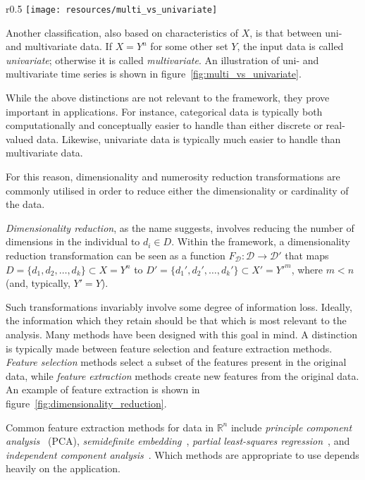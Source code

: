 \begin{wrapfigure}{r}{0.5\textwidth}
\changecaptionwidth
{}
\texttt{[image: resources/multi\_vs\_univariate]}
\caption[derp]{Two sine curves regarded as two separate univariate time series (dotted lines) and as one multivariate time series (solid lines).}
\label{fig:multi_vs_univariate}
\end{wrapfigure}

Another classification, also based on characteristics of $X$, is that between uni- and multivariate data. If $X = Y^n$ for some other set $Y$, the input data is called \emph{univariate}; otherwise it is called \emph{multivariate}. An illustration of uni- and multivariate time series is shown in figure~\ref{fig:multi_vs_univariate}.

While the above distinctions are not relevant to the framework, they prove important in applications. For instance, categorical data is typically both computationally and conceptually easier to handle than either discrete or real-valued data. Likewise, univariate data is typically much easier to handle than multivariate data.

For this reason, dimensionality and numerosity reduction transformations are commonly utilised in order to reduce either the dimensionality or cardinality of the data.

\emph{Dimensionality reduction}, as the name suggests, involves reducing the number of dimensions in the individual to $d_i \in D$. Within the framework, a dimensionality reduction transformation can be seen as a function $F_\mathcal{D}: \mathcal{D} \rightarrow \mathcal{D}'$ that maps $D = \{d_1, d_2, \dots, d_k\} \subset X = Y^n$ to $D' = \{d_1', d_2', \dots, d_k'\} \subset X' = {Y'}^m$, where $m < n$ (and, typically, $Y' = Y$).

Such transformations invariably involve some degree of information loss. Ideally, the information which they retain should be that which is most relevant to the analysis. Many methods have been designed with this goal in mind. A distinction is typically made between feature selection and feature extraction methods. \emph{Feature selection} methods select a subset of the features present in the original data, while \emph{feature extraction} methods create new features from the original data. An example of feature extraction is shown in figure~\ref{fig:dimensionality_reduction}.

Common feature extraction methods for data in $\mathbb{R}^n$ include \emph{principle component analysis}~\cite{TODO} (PCA), \emph{semidefinite embedding}~\cite{TODO}, \emph{partial least-squares regression}~\cite{TODO}, and \emph{independent component analysis}~\cite{TODO}. Which methods are appropriate to use depends heavily on the application.

